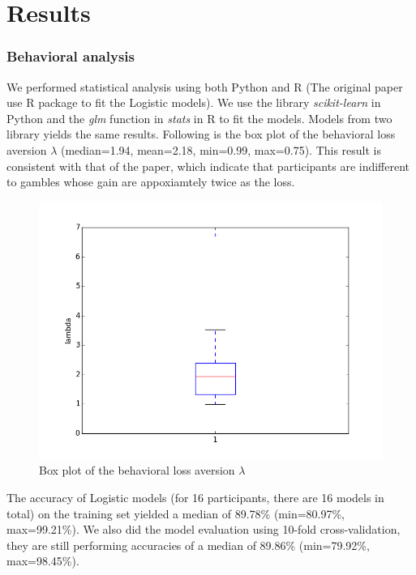 \section{Results}

\subsubsection{Behavioral analysis}

We performed statistical analysis using both Python and R (The original paper use R package to fit the Logistic models). We use the library \emph{scikit-learn} in Python and the \emph{glm} function in \emph{stats} in R to fit the models. Models from two library yields the same results. Following is the box plot of the behavioral loss aversion $\lambda$ (median=1.94, mean=2.18, min=0.99, max=0.75). This result is consistent with that of the paper, which indicate that participants are indifferent to gambles whose gain are appoxiamtely twice as the loss. 
\begin{figure}[H]
\caption{Box plot of the behavioral loss aversion $\lambda$ }
    \centering
        \includegraphics[scale=0.35]{figures/lambda_boxplot.png}
\end{figure}
The accuracy of Logistic models (for 16 participants, there are 16 models in total) on the training set yielded a median of 89.78\% (min=80.97\%, max=99.21\%). We also did the model evaluation using 10-fold cross-validation, they are still performing accuracies of a median of 89.86\% (min=79.92\%, max=98.45\%).

